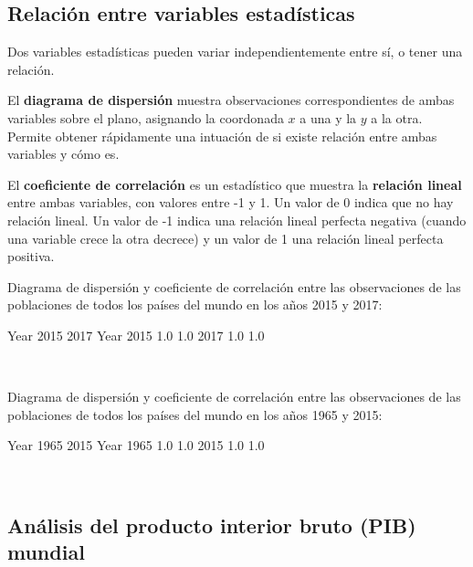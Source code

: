 \documentclass[11pt]{article}
\begin{document}
    \subsection{Relación entre variables
estadísticas}\label{relaciuxf3n-entre-variables-estaduxedsticas}

Dos variables estadísticas pueden variar independientemente entre sí, o
tener una relación.

El \textbf{diagrama de dispersión} muestra observaciones
correspondientes de ambas variables sobre el plano, asignando la
coordonada \(x\) a una y la \(y\) a la otra. Permite obtener rápidamente
una intuación de si existe relación entre ambas variables y cómo es.

El \textbf{coeficiente de correlación} es un estadístico que muestra la
\textbf{relación lineal} entre ambas variables, con valores entre -1 y
1. Un valor de 0 indica que no hay relación lineal. Un valor de -1
indica una relación lineal perfecta negativa (cuando una variable crece
la otra decrece) y un valor de 1 una relación lineal perfecta positiva.

    Diagrama de dispersión y coeficiente de correlación entre las
observaciones de las poblaciones de todos los países del mundo en los
años 2015 y 2017:

Year  2015  2017
Year            
2015   1.0   1.0
2017   1.0   1.0
            
    \begin{center}
    \end{center}
    { \hspace*{\fill} \\}
    
    Diagrama de dispersión y coeficiente de correlación entre las
observaciones de las poblaciones de todos los países del mundo en los
años 1965 y 2015:

Year  1965  2015
Year            
1965   1.0   1.0
2015   1.0   1.0
            
    \begin{center}
    \end{center}
    { \hspace*{\fill} \\}
    
    \subsection*{Análisis del producto interior bruto (PIB)
mundial}\label{anuxe1lisis-del-producto-interior-bruto-pib-mundial}
\end{document}
